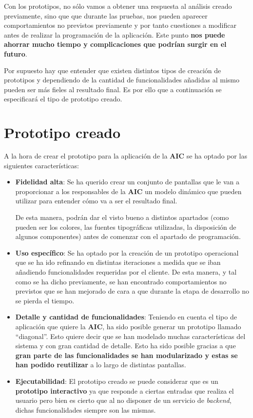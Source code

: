 \documentclass{\ClassPath/viu-tfm-template}
\begin{document}
Con los prototipos, no sólo vamos a obtener una respuesta al análisis creado previamente, sino que que durante las pruebas, nos pueden aparecer comportamientos no previstos previamente y por tanto cuestiones a modificar antes de realizar la programación de la aplicación. Este punto \textbf{nos puede ahorrar mucho tiempo y complicaciones que podrían surgir en el futuro}.

Por supuesto hay que entender que existen distintos tipos de creación de prototipos y dependiendo de la cantidad de funcionalidades añadidas al mismo pueden ser más fieles al resultado final. Es por ello que a continuación se especificará el tipo de prototipo creado.


\section{Prototipo creado}

A la hora de crear el prototipo para la aplicación de la \textbf{AIC} se ha optado por las siguientes características:

\vspace{-1em}
\begin{itemize}
    \item \textbf{Fidelidad alta}: Se ha querido crear un conjunto de pantallas que le van a proporcionar a los responsables de la \textbf{AIC} un modelo dinámico que pueden utilizar para entender cómo va a ser el resultado final.

    De esta manera, podrán dar el visto bueno a distintos apartados (como pueden ser los colores, las fuentes tipográficas utilizadas, la disposición de algunos componentes) antes de comenzar con el apartado de programación.

    \item \textbf{Uso específico}: Se ha optado por la creación de un prototipo operacional que se ha ido refinando en distintas iteraciones a medida que se iban añadiendo funcionalidades requeridas por el cliente. De esta manera, y tal como se ha dicho previamente, se han encontrado comportamientos no previstos que se han mejorado de cara a que durante la etapa de desarrollo no se pierda el tiempo.

    \item \textbf{Detalle y cantidad de funcionalidades}: Teniendo en cuenta el tipo de aplicación que quiere la \textbf{AIC}, ha sido posible generar un prototipo llamado “diagonal”. Esto quiere decir que se han modelado muchas características del sistema y con gran cantidad de detalle. Esto ha sido posible gracias a que \textbf{gran parte de las funcionalidades se han modularizado y estas se han podido reutilizar} a lo largo de distintas pantallas.

    \item \textbf{Ejecutabilidad}: El prototipo creado se puede considerar que es un \textbf{prototipo interactivo} ya que responde a ciertas entradas que realiza el usuario pero bien es cierto que al no disponer de un servicio de \textit{backend}, dichas funcionalidades siempre son las mismas.
\end{itemize}
\end{document}
